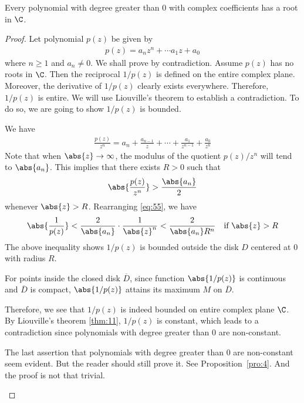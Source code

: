 \documentclass[thmcnt=section, color=cyan, 12pt]{my-elegantbook}
\begin{document}
\begin{theorem} \label{thm:11}
\end{theorem}

\begin{theorem} \label{thm:12}
    Every polynomial with degree greater than $0$ with complex coefficients has a
    root in $\C$.
\end{theorem}

\begin{proof}
    Let polynomial $p(z)$ be given by
    \begin{align*}
        p(z) = a_n z^n + \cdots a_1 z + a_0
    \end{align*}
    where $n \geq 1$ and $a_n \neq 0$.
    We shall prove by contradiction.
    Assume $p(z)$ has no roots in $\C$. Then the reciprocal $1 / p(z)$ is defined on the entire
    complex plane.
    Moreover, the derivative of $1 / p(z)$ clearly exists everywhere.
    Therefore, $1 / p(z)$ is entire.
    We will use Liouville's theorem to establish a contradiction.
    To do so, we are going to show $1 / p(z)$ is bounded.

    We have
    \begin{align*}
        \frac{p(z)}{z^n} = a_n + \frac{a_{n-1}}{z} + \cdots + \frac{a_1}{z^{n-1}} + \frac{a_0}{z^n}
    \end{align*}
    Note that when $\abs{z} \to \infty$, the modulus of the quotient $p(z) / z^n$ will
    tend to $\abs{a_n}$.
    This implies that there exists $R > 0$ such that
    \begin{align}
        \abs{\frac{p(z)}{z^n}} > \frac{\abs{a_n}}{2}
        \label{eq:55}
    \end{align}
    whenever $\abs{z} > R$. Rearranging \eqref{eq:55}, we have
    \begin{align*}
        \abs{\frac{1}{p(z)}} < \frac{2}{\abs{a_n}} \cdot \frac{1}{\abs{z}^n} < \frac{2}{\abs{a_n} R^n} \quad \text{if } \abs{z} > R
    \end{align*}
    The above inequality shows $1 / p(z)$ is bounded outside the disk $D$ centered
    at $0$ with radius $R$.

    For points inside the closed disk $\overline{D}$, since function $\abs{1 / p(z)}$ is
    continuous and $\overline{D}$ is compact, $\abs{1 / p(z)}$ attains its maximum $M$ on $\overline{D}$.

    Therefore, we see that $1 / p(z)$ is indeed bounded on entire complex plane $\C$.
    By Liouville's theorem \ref{thm:11}, $1 / p(z)$ is constant, which leads to a
    contradiction since polynomials with degree greater than $0$ are non-constant.


    \begin{note}
        The last assertion that polynomials with degree greater than $0$ are
        non-constant seem evident. But the reader should still prove it. See Proposition~\ref{pro:4}.
        And the proof is not that trivial.
    \end{note}
\end{proof}
\end{document}
